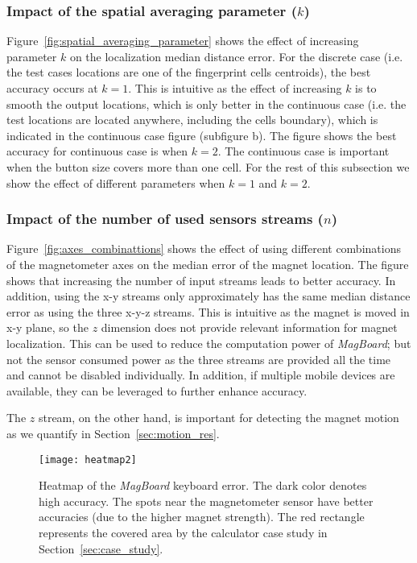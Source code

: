 \documentclass[conference]{IEEEtran}
\def \sys {\textit{MagBoard}}
\begin{document}
\subsubsection{Impact of the spatial averaging parameter ($k$)}
\label{sec:impact_of_spatial_averaging_parameter_k}
Figure~\ref{fig:spatial_averaging_parameter} shows the effect of increasing parameter $k$ on the localization median distance error. For the discrete case (i.e. the test cases locations are one of the fingerprint cells centroids), the best accuracy occurs at $k=1$. This is intuitive as the effect of increasing $k$ is to smooth the output locations, which is only better in the continuous case (i.e. the test locations are located anywhere, including the cells boundary), which is indicated in the continuous case figure (subfigure b). The figure shows the best accuracy for continuous case is when $k=2$. The continuous case is important when the button size covers more than one cell. For the rest of this subsection we show the effect of different parameters when $k=1$ and $k=2$. 

\subsubsection{Impact of the number of used sensors streams ($n$)}
Figure~\ref{fig:axes_combinattions} shows the effect of using different combinations of the magnetometer axes on the median error of the magnet location. The figure shows that increasing the number of input streams leads to better accuracy. In addition, using the x-y streams only approximately has the same 
median distance error as using the three x-y-z streams. This is intuitive as the magnet is moved in x-y plane, so the $z$ dimension does not provide relevant information for magnet localization. This can be used to reduce the computation power of \sys{}; 
but not the sensor consumed power as the three streams are provided all the time and cannot be disabled individually. 
In addition, if multiple mobile devices are available, they can be leveraged to further enhance accuracy.

The $z$ stream, on the other hand, is important for detecting the magnet motion as we quantify in Section~\ref{sec:motion_res}.

\begin{figure}[!t]
\centering
\texttt{[image: heatmap2]}
\caption{Heatmap of the \sys{} keyboard error. The dark color denotes high accuracy. 
The spots near the magnetometer sensor have better accuracies (due to the higher magnet strength). 
 The red rectangle represents the covered area by the calculator case study in Section~\ref{sec:case_study}.}
\label{fig:heatmap}
\vspace{-0.2in}
\end{figure}
\end{document}

